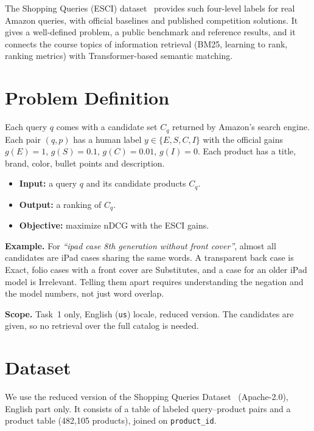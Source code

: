 \documentclass[11pt,a4paper]{article}
\begin{document}
The Shopping Queries (ESCI) dataset~\cite{esci,aicrowd} provides such four-level labels for real Amazon queries, with official baselines and published competition solutions. It gives a well-defined problem, a public benchmark and reference results, and it connects the course topics of information retrieval (BM25, learning to rank, ranking metrics) with Transformer-based semantic matching.

\section{Problem Definition}
Each query $q$ comes with a candidate set $C_q$ returned by Amazon's search engine. Each pair $(q,p)$ has a human label $y \in \{E,S,C,I\}$ with the official gains $g(E)=1$, $g(S)=0.1$, $g(C)=0.01$, $g(I)=0$. Each product has a title, brand, color, bullet points and description.
\begin{itemize}
  \item \textbf{Input:} a query $q$ and its candidate products $C_q$.
  \item \textbf{Output:} a ranking of $C_q$.
  \item \textbf{Objective:} maximize nDCG with the ESCI gains.
\end{itemize}
\noindent\textbf{Example.} For \emph{``ipad case 8th generation without front cover''}, almost all candidates are iPad cases sharing the same words. A transparent back case is Exact, folio cases with a front cover are Substitutes, and a case for an older iPad model is Irrelevant. Telling them apart requires understanding the negation and the model numbers, not just word overlap.

\noindent\textbf{Scope.} Task~1 only, English (\texttt{us}) locale, reduced version. The candidates are given, so no retrieval over the full catalog is needed.

\section{Dataset}
We use the reduced version of the Shopping Queries Dataset~\cite{esci} (Apache-2.0), English part only. It consists of a table of labeled query--product pairs and a product table (482,105 products), joined on \texttt{product\_id}.
\end{document}
